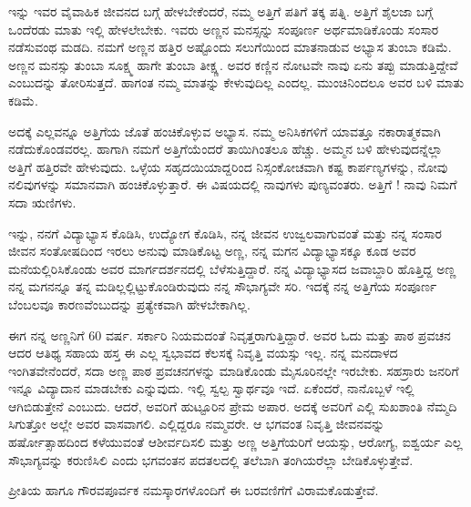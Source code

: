 {ಇನ್ನು ಇವರ ವೈವಾಹಿಕ ಜೀವನದ ಬಗ್ಗೆ ಹೇಳಬೇಕೆಂದರೆ, ನಮ್ಮ ಅತ್ತಿಗೆ ಪತಿಗೆ ತಕ್ಕ ಪತ್ನಿ. ಅತ್ತಿಗೆ   \enginline{-}   ಶೈಲಜಾ ಬಗ್ಗೆ ಒಂದೆರಡು ಮಾತು ಇಲ್ಲಿ ಹೇಳಲೇಬೇಕು. ಇವರು ಅಣ್ಣನ ಮನಸ್ಸನ್ನು ಸಂಪೂರ್ಣ ಅರ್ಥಮಾಡಿಕೊಂಡು ಸಂಸಾರ ನಡೆಸುವಂಥ ಮಡದಿ.  ನಮಗೆ ಅಣ್ಣನ ಹತ್ತಿರ ಅಷ್ಟೊಂದು ಸಲುಗೆಯಿಂದ ಮಾತನಾಡುವ ಅಭ್ಯಾಸ ತುಂಬಾ ಕಡಿಮೆ. ಅಣ್ಣನ ಮನಸ್ಸು ತುಂಬಾ ಸೂಕ್ಷ್ಮ ಹಾಗೇ ತುಂಬಾ ತೀಕ್ಷ್ಣ. ಅವರ ಕಣ್ಣಿನ ನೋಟವೇ ನಾವು ಏನು ತಪ್ಪು ಮಾಡುತ್ತಿದ್ದೇವೆ ಎಂಬುದನ್ನು ತೋರಿಸುತ್ತದೆ. ಹಾಗಂತ ನಮ್ಮ ಮಾತನ್ನು ಕೇಳುವುದಿಲ್ಲ ಎಂದಲ್ಲ. ಮುಂಚಿನಿಂದಲೂ ಅವರ ಬಳಿ ಮಾತು ಕಡಿಮೆ.

ಅದಕ್ಕೆ ಎಲ್ಲವನ್ನೂ ಅತ್ತಿಗೆಯ ಜೊತೆ ಹಂಚಿಕೊಳ್ಳುವ ಅಭ್ಯಾಸ. ನಮ್ಮ ಅನಿಸಿಕಗಳಿಗೆ ಯಾವತ್ತೂ ನಕಾರಾತ್ಮಕವಾಗಿ ನಡೆದುಕೊಂಡವರಲ್ಲ.  ಹಾಗಾಗಿ ನಮಗೆ ಅತ್ತಿಗೆಯೆಂದರೆ ತಾಯಿಗಿಂತಲೂ ಹೆಚ್ಚು.  ಅಮ್ಮನ ಬಳಿ ಹೇಳುವುದನ್ನೆಲ್ಲಾ ಅತ್ತಿಗೆ ಹತ್ತಿರವೇ ಹೇಳುವುದು. ಒಳ್ಳೆಯ ಸಹೃದಯಿಯಾದ್ದರಿಂದ ನಿಸ್ಸಂಕೋಚವಾಗಿ ಕಷ್ಟ ಕಾರ್ಪಣ್ಯಗಳನ್ನು, ನೋವು ನಲಿವುಗಳನ್ನು ಸಮಾನವಾಗಿ ಹಂಚಿಕೊಳ್ಳುತ್ತಾರೆ. ಈ ವಿಷಯದಲ್ಲಿ ನಾವುಗಳು ಪುಣ್ಯವಂತರು. ಅತ್ತಿಗೆ ! ನಾವು ನಿಮಗೆ ಸದಾ ಋಣಿಗಳು.

ಇನ್ನು, ನನಗೆ ವಿದ್ಯಾಭ್ಯಾಸ ಕೊಡಿಸಿ, ಉದ್ಯೋಗ ಕೊಡಿಸಿ, ನನ್ನ ಜೀವನ ಉಜ್ವಲ\-ವಾಗುವಂತೆ ಮತ್ತು ನನ್ನ ಸಂಸಾರ ಜೀವನ ಸಂತೋಷದಿಂದ ಇರಲು ಅನುವು ಮಾಡಿಕೊಟ್ಟ ಅಣ್ಣ, ನನ್ನ ಮಗನ ವಿದ್ಯಾಭ್ಯಾಸಕ್ಕೂ ಕೂಡ ಅವರ ಮನೆಯಲ್ಲಿರಿಸಿಕೊಂಡು ಅವರ ಮಾರ್ಗದರ್ಶನದಲ್ಲಿ ಬೆಳೆಸುತ್ತಿದ್ದಾರೆ.  ನನ್ನ ವಿದ್ಯಾಭ್ಯಾಸದ ಜವಾಬ್ದಾರಿ ಹೊತ್ತಿದ್ದ ಅಣ್ಣ  ನನ್ನ ಮಗನನ್ನೂ ತನ್ನ ಮಡಿಲ್ಲಲ್ಲಿಟ್ಟುಕೊಂಡಿರುವುದು ನನ್ನ ಸೌಭಾಗ್ಯವೇ ಸರಿ. ಇದಕ್ಕೆ ನನ್ನ ಅತ್ತಿಗೆಯ ಸಂಪೂರ್ಣ ಬೆಂಬಲವೂ ಕಾರಣವೆಂಬುದನ್ನು ಪ್ರತ್ಯೇಕವಾಗಿ ಹೇಳಬೇಕಾಗಿಲ್ಲ. 

ಈಗ ನನ್ನ ಅಣ್ಣನಿಗೆ 60 ವರ್ಷ. ಸರ್ಕಾರಿ ನಿಯಮದಂತೆ ನಿವೃತ್ತರಾಗುತ್ತಿದ್ದಾರೆ. ಅವರ ಓದು ಮತ್ತು ಪಾಠ  \enginline{-}  ಪ್ರವಚನ ಆದರ  \enginline{-}  ಆತಿಥ್ಯ ಸಹಾಯ ಹಸ್ತ ಈ ಎಲ್ಲ ಸ್ವಭಾವದ ಕೆಲಸಕ್ಕೆ ನಿವೃತ್ತಿ ವಯಸ್ಸು ಇಲ್ಲ.  ನನ್ನ ಮನದಾಳದ ಇಂಗಿತವೇನೆಂದರೆ, ಸದಾ ಅಣ್ಣ ಪಾಠ  \enginline{-}  ಪ್ರವಚನಗಳನ್ನು ಮಾಡಿಕೊಂಡು ಮೈಸೂರಿನಲ್ಲೇ ಇರಬೇಕು.  ಸಹಸ್ರಾರು ಜನರಿಗೆ ಇನ್ನೂ ವಿದ್ಯಾದಾನ ಮಾಡಬೇಕು ಎನ್ನುವುದು.  ಇಲ್ಲಿ ಸ್ವಲ್ಪ ಸ್ವಾರ್ಥವೂ ಇದೆ. ಏಕೆಂದರೆ, ನಾನೊಬ್ಬಳೆ ಇಲ್ಲಿ ಆಗಿಬಿಡುತ್ತೇನೆ ಎಂಬುದು.  ಆದರೆ, ಅವರಿಗೆ ಹುಟ್ಟೂರಿನ ಪ್ರೇಮ ಅಪಾರ.  ಅದಕ್ಕೆ ಅವರಿಗೆ ಎಲ್ಲಿ ಸುಖಶಾಂತಿ ನೆಮ್ಮದಿ ಸಿಗುತ್ತೋ ಅಲ್ಲೇ ಅವರ ವಾಸವಾಗಲಿ. ಎಲ್ಲಿದ್ದರೂ ನಮ್ಮವರೇ.  ಆ ಭಗವಂತ  ನಿವೃತ್ತಿ ಜೀವನವನ್ನು ಹರ್ಷೋತ್ಸಾಹದಿಂದ ಕಳೆಯುವಂತೆ ಆಶೀರ್ವದಿಸಲಿ ಮತ್ತು ಅಣ್ಣ ಅತ್ತಿಗೆಯರಿಗೆ ಆಯಸ್ಸು, ಆರೋಗ್ಯ, ಐಶ್ವರ್ಯ ಎಲ್ಲ ಸೌಭಾಗ್ಯವನ್ನು  ಕರುಣಿಸಿಲಿ ಎಂದು ಭಗವಂತನ ಪದತಲದಲ್ಲಿ ತಲೆಬಾಗಿ ತಂಗಿಯರೆಲ್ಲಾ ಬೇಡಿಕೊಳ್ಳುತ್ತೇವೆ.

ಪ್ರೀತಿಯ ಹಾಗೂ ಗೌರವಪೂರ್ವಕ ನಮಸ್ಕಾರಗಳೊಂದಿಗೆ ಈ ಬರವಣಿಗೆಗೆ ವಿರಾಮ\-ಕೊಡುತ್ತೇವೆ.

\articleend
}
